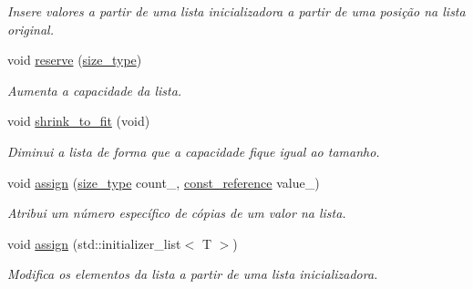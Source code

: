 \begin{DoxyCompactItemize}
\begin{DoxyCompactList}\small\item\em Insere valores a partir de uma lista inicializadora a partir de uma posição na lista original. \end{DoxyCompactList}\item 
\mbox{\label{classsc_1_1vector_a58951f9d3202027e0de28e8f9e0eb542}} 
void \hyperlink{classsc_1_1vector_a58951f9d3202027e0de28e8f9e0eb542}{reserve} (\hyperlink{classsc_1_1vector_a48bf37ba1a6d0c13504414d86e27c399}{size\+\_\+type})
\begin{DoxyCompactList}\small\item\em Aumenta a capacidade da lista. \end{DoxyCompactList}\item 
\mbox{\label{classsc_1_1vector_a9468a8d103dfe4b4979d26668cab9c63}} 
void \hyperlink{classsc_1_1vector_a9468a8d103dfe4b4979d26668cab9c63}{shrink\+\_\+to\+\_\+fit} (void)
\begin{DoxyCompactList}\small\item\em Diminui a lista de forma que a capacidade fique igual ao tamanho. \end{DoxyCompactList}\item 
\mbox{\label{classsc_1_1vector_a6295cd66e564a954bc384fc016dc80a0}} 
void \hyperlink{classsc_1_1vector_a6295cd66e564a954bc384fc016dc80a0}{assign} (\hyperlink{classsc_1_1vector_a48bf37ba1a6d0c13504414d86e27c399}{size\+\_\+type} count\+\_\+, \hyperlink{classsc_1_1vector_a8da2b1a11b069241100f9b2e14f481a0}{const\+\_\+reference} value\+\_\+)
\begin{DoxyCompactList}\small\item\em Atribui um número específico de cópias de um valor na lista. \end{DoxyCompactList}\item 
\mbox{\label{classsc_1_1vector_a87df3c4e180760eaf49a64fb0b470aef}} 
void \hyperlink{classsc_1_1vector_a87df3c4e180760eaf49a64fb0b470aef}{assign} (std\+::initializer\+\_\+list$<$ T $>$)
\begin{DoxyCompactList}\small\item\em Modifica os elementos da lista a partir de uma lista inicializadora. \end{DoxyCompactList}\item 

\end{DoxyCompactItemize}
